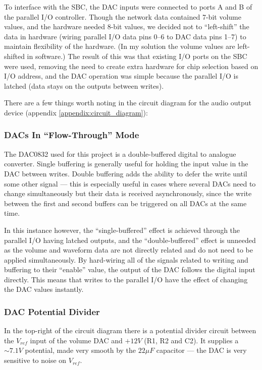 To interface with the SBC, the DAC inputs were connected to ports A and B of the parallel I/O 
controller.  Though the network data contained 7-bit volume values, and the hardware needed 8-bit 
values, we decided not to ``left-shift'' the data in hardware (wiring parallel I/O data pins 0--6 to 
DAC data pins 1--7) to maintain flexibility of the hardware.  (In my solution the volume values are 
left-shifted in software.)  The result of this was that existing I/O ports on the SBC were used, 
removing the need to create extra hardware for chip selection based on I/O address, and the DAC 
operation was simple because the parallel I/O is latched (data stays on the outputs between writes).

There are a few things worth noting in the circuit diagram for the audio output device (appendix 
\ref{appendix:circuit_diagram}):

\subsubsection{DACs In ``Flow-Through'' Mode}

The DAC0832 used for this project is a double-buffered digital to analogue converter.  Single 
buffering is generally useful for holding the input value in the DAC between writes.  Double 
buffering adds the ability to defer the write until some other signal --- this is especially useful 
in cases where several DACs need to change simultaneously but their data is received asynchronously, 
since the write between the first and second buffers can be triggered on all DACs at the same time.

In this instance however, the ``single-buffered'' effect is achieved through the parallel I/O having 
latched outputs, and the ``double-buffered'' effect is unneeded as the volume and waveform data are 
not directly related and do not need to be applied simultaneously.  By hard-wiring all of the 
signals related to writing and buffering to their ``enable'' value, the output of the DAC follows 
the digital input directly.  This means that writes to the parallel I/O have the effect of changing 
the DAC values instantly.

\subsubsection{DAC Potential Divider}

In the top-right of the circuit diagram there is a potential divider circuit between the $V_{ref}$ 
input of the volume DAC and $+12V$ (R1, R2 and C2).  It supplies a $\sim7.1V$ potential, made very 
smooth by the $22\mu{}F$ capacitor --- the DAC is very sensitive to noise on $V_{ref}$.

